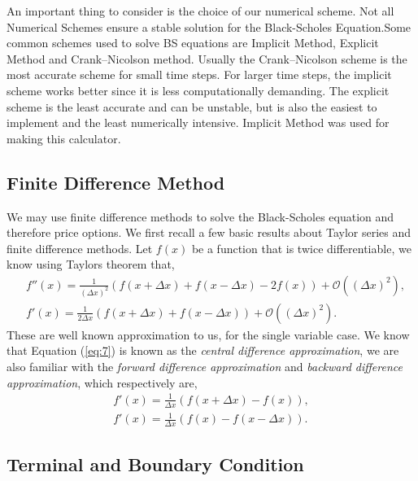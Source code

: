 \documentclass[12pt]{article}
\begin{document}
An important thing to consider is the choice of our numerical scheme. Not all Numerical Schemes ensure a stable solution for the Black-Scholes Equation.Some common schemes used to solve BS equations are Implicit Method, Explicit Method and Crank–Nicolson method.
Usually the Crank–Nicolson scheme is the most accurate scheme for small time steps. For larger time steps, the implicit scheme works better since it is less computationally demanding. The explicit scheme is the least accurate and can be unstable, but is also the easiest to implement and the least numerically intensive. Implicit Method was used for making this calculator.

	
\subsection{Finite Difference Method}

\label{fdms}
We may use finite difference methods to solve the Black-Scholes equation and therefore price options. We first recall a few basic results about Taylor series and finite difference methods. Let $f(x)$ be a function that is twice differentiable, we know using Taylors theorem that,
\begin{align}
	&f''(x) = \frac{1}{(\Delta x)^2} (f(x + \Delta x) + f(x - \Delta x) - 2f(x))  + \mathcal{O}((\Delta x)^2)\label{C1},\\
	&f'(x) = \frac{1}{2\Delta x}(f(x + \Delta x) + f(x - \Delta x)) + \mathcal{O}((\Delta x)^2). \label{eq:7}
\end{align}
These are well known approximation to us, for the single variable case. We know that Equation (\ref{eq:7}) is known as the \emph{central difference approximation}, we are also familiar with the \emph{forward difference approximation} and \emph{backward difference approximation}, which respectively are,
\begin{align*}
	f'(x) = \frac{1}{\Delta x}(f(x + \Delta x) -f(x)), \\
	f'(x) = \frac{1}{\Delta x}(f(x) -f(x-\Delta x)).
\end{align*}
\cite{bworld1}
\subsection{Terminal and Boundary Condition}
\end{document}

